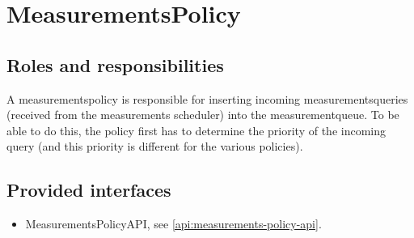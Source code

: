 \section{MeasurementsPolicy}
\label{element:measurements-policy}

\subsection{Roles and responsibilities}

\npar A measurementspolicy is responsible for inserting incoming
measurementsqueries (received from the measurements scheduler) into the
measurementqueue. To be able to do this, the policy first has to determine the
priority of the incoming query (and this priority is different for the various
policies).

\subsection{Provided interfaces}

\begin{itemize}
  \item MeasurementsPolicyAPI, see \ref{api:measurements-policy-api}.
\end{itemize}